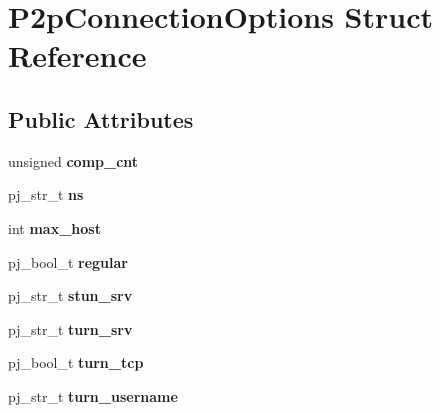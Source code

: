 \hypertarget{structP2pConnectionOptions}{
\section{P2pConnectionOptions Struct Reference}
\label{structP2pConnectionOptions}
}
\subsection*{Public Attributes}
\begin{DoxyCompactItemize}
\item 
\hypertarget{structP2pConnectionOptions_aa3fdf3178b382fd24225c9856144a7ae}{
unsigned {\bfseries comp\_\-cnt}}
\label{structP2pConnectionOptions_aa3fdf3178b382fd24225c9856144a7ae}

\item 
\hypertarget{structP2pConnectionOptions_ab7608d18c5dc608abf58edc099b6911b}{
pj\_\-str\_\-t {\bfseries ns}}
\label{structP2pConnectionOptions_ab7608d18c5dc608abf58edc099b6911b}

\item 
\hypertarget{structP2pConnectionOptions_aebb8bf7a5b5c0bf690f91c9a83fc405a}{
int {\bfseries max\_\-host}}
\label{structP2pConnectionOptions_aebb8bf7a5b5c0bf690f91c9a83fc405a}

\item 
\hypertarget{structP2pConnectionOptions_a4495e7a652f55999cd84847a70ac07e4}{
pj\_\-bool\_\-t {\bfseries regular}}
\label{structP2pConnectionOptions_a4495e7a652f55999cd84847a70ac07e4}

\item 
\hypertarget{structP2pConnectionOptions_ab378112c8f59bba49ef2d54c083e6427}{
pj\_\-str\_\-t {\bfseries stun\_\-srv}}
\label{structP2pConnectionOptions_ab378112c8f59bba49ef2d54c083e6427}

\item 
\hypertarget{structP2pConnectionOptions_aa0a96958c4cd6738ec2180df5a57e280}{
pj\_\-str\_\-t {\bfseries turn\_\-srv}}
\label{structP2pConnectionOptions_aa0a96958c4cd6738ec2180df5a57e280}

\item 
\hypertarget{structP2pConnectionOptions_a7bd0d9239fc17f933877334465715bed}{
pj\_\-bool\_\-t {\bfseries turn\_\-tcp}}
\label{structP2pConnectionOptions_a7bd0d9239fc17f933877334465715bed}

\item 
\hypertarget{structP2pConnectionOptions_a3f82fdb3ce2b3185de56d043029f43c3}{
pj\_\-str\_\-t {\bfseries turn\_\-username}}
\label{structP2pConnectionOptions_a3f82fdb3ce2b3185de56d043029f43c3}


\end{DoxyCompactItemize}

